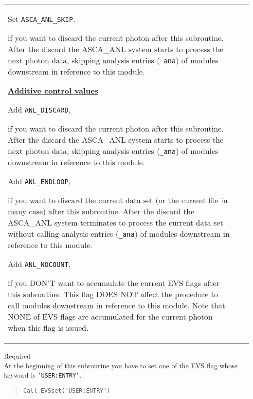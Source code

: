 \begin{description}
\begin{tabular}{l@{\ (}c@{)\ }p{}}
        Set {\tt ASCA\_ANL\_SKIP},\par
        \hfill\parbox{0.65\textwidth}{
            if you want to discard the current photon after this subroutine.
            After the discard
            the ASCA\_ANL system starts to process the next photon data,
            skipping analysis entries ({\tt *\_ana}) of modules
            downstream in reference to this module.
        }\par
        \bigskip
        \underline{\bf Additive control values} \par
        Add {\tt ANL\_DISCARD},\par
        \hfill\parbox{0.65\textwidth}{
            if you want to discard the current photon after this subroutine.
            After the discard
            the ASCA\_ANL system starts to process the next photon data,
            skipping analysis entries ({\tt *\_ana}) of modules
            downstream in reference to this module.
        }\par
        Add {\tt ANL\_ENDLOOP},\par
        \hfill\parbox{0.65\textwidth}{
            if you want to discard the current data set (or the current file
            in many case) after this subroutine.
            After the discard
            the ASCA\_ANL system terminates to process the current data set
            without calling analysis entries ({\tt *\_ana}) of modules 
            downstream in reference to this module.
        }\par
        Add {\tt ANL\_NOCOUNT},\par
        \hfill\parbox{0.65\textwidth}{
            if you DON'T want to accumulate the current EVS flags
            after this subroutine.
            This flag DOES NOT affect the procedure to call modules
            downstream in reference to this module.
            Note that NONE of EVS flags are accumulated for the current photon
            when this flag is issued.
        }\par\\
 \end{tabular}\newpage
\item{Required} \\
   At the beginning of this subroutine you have to set one of the EVS flag
   whose keyword is {\tt 'USER:ENTRY'}.
\begin{quote}\baselineskip 3.2mm\begin{verbatim}
Call EVSset('USER:ENTRY')
\end{verbatim}\end{quote}

\end{description}
